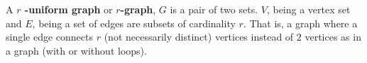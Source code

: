 \begin{definition}[Hypergraphs]
	A \textbf{\(r\) -uniform graph} or \textbf{\(r\)-graph}, \(G\) is a pair of two sets. \(V\), being a vertex set and \(E\), being a set of edges are subsets of cardinality \(r\). That is, a graph where a single edge connects \(r\) (not necessarily distinct) vertices instead of \(2\) vertices as in a graph (with or without loops).
\end{definition}
